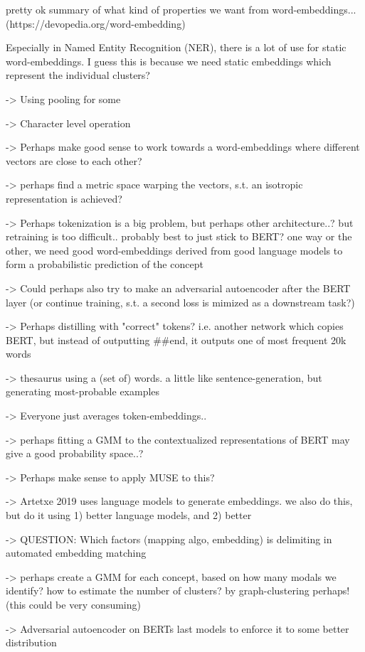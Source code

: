 \documentclass[a4paper,12pt,twoside,openright]{report}
\begin{document}
pretty ok summary of what kind of properties we want from word-embeddings... (https://devopedia.org/word-embedding)


Especially in Named Entity Recognition (NER), there is a lot of use for static word-embeddings.
I guess this is because we need static embeddings which represent the individual clusters?

-> Using pooling for some 

-> Character level operation

-> Perhaps make good sense to work towards a word-embeddings where different vectors are close to each other?

-> perhaps find a metric space warping the vectors, s.t. an isotropic representation is achieved?

-> Perhaps tokenization is a big problem, but perhaps other architecture..? but retraining is too difficult.. probably best to just stick to BERT? one way or the other, we need good word-embeddings derived from good language models to form a probabilistic prediction of the concept


-> Could perhaps also try to make an adversarial autoencoder after the BERT layer (or continue training, s.t. a second loss is mimized as a downstream task?)

-> Perhaps distilling with "correct" tokens? i.e. another network which copies BERT, but instead of outputting \#\#end, it outputs one of most frequent 20k words

-> thesaurus using a (set of) words. a little like sentence-generation, but generating most-probable examples

-> Everyone just averages token-embeddings..

-> perhaps fitting a GMM to the contextualized representations of BERT may give a good probability space..?

-> Perhaps make sense to apply MUSE to this?

-> Artetxe 2019 uses language models to generate embeddings. we also do this, but do it using 1) better language models, and 2) better 

-> QUESTION: Which factors (mapping algo, embedding) is delimiting in automated embedding matching

-> perhaps create a GMM for each concept, based on how many modals we identify? how to estimate the number of clusters? by graph-clustering perhaps! (this could be very consuming)

-> Adversarial autoencoder on BERTs last models to enforce it to some better distribution
\end{document}
